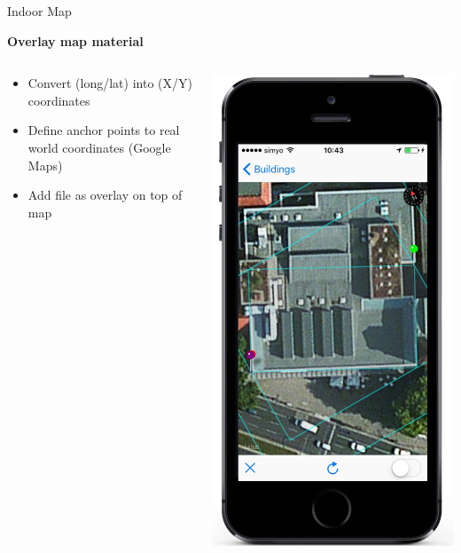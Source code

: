 \documentclass[11pt]{beamer}
\begin{document}
\begin{frame}{Indoor Map}

\textbf{Overlay map material}

  \begin{columns}[T]
  \begin{column}{.6\textwidth}
  \begin{itemize}
    \item Convert (long/lat) into (X/Y) coordinates
    \item Define anchor points to real world coordinates (Google Maps)
    \item Add file as overlay on top of map
  \end{itemize}
  \end{column}
  \begin{column}{.4\textwidth}
  \includegraphics[scale=0.25]{mapfirststep}
  \end{column}
\end{columns}


\end{frame}
\end{document}
